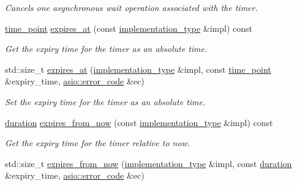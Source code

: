 \begin{DoxyCompactItemize}
\begin{DoxyCompactList}\small\item\em Cancels one asynchronous wait operation associated with the timer. \end{DoxyCompactList}\item 
\hyperlink{classasio_1_1waitable__timer__service_ae2aa2b85484d98323747703cb9e104df}{time\+\_\+point} \hyperlink{classasio_1_1waitable__timer__service_af369248a0a3dab5f46168a780176ba25}{expires\+\_\+at} (const \hyperlink{classasio_1_1waitable__timer__service_a397aa07a3c8f707a307b83a9616ed44e}{implementation\+\_\+type} \&impl) const 
\begin{DoxyCompactList}\small\item\em Get the expiry time for the timer as an absolute time. \end{DoxyCompactList}\item 
std\+::size\+\_\+t \hyperlink{classasio_1_1waitable__timer__service_a81514e94b12354e0fd2a0af363a352c7}{expires\+\_\+at} (\hyperlink{classasio_1_1waitable__timer__service_a397aa07a3c8f707a307b83a9616ed44e}{implementation\+\_\+type} \&impl, const \hyperlink{classasio_1_1waitable__timer__service_ae2aa2b85484d98323747703cb9e104df}{time\+\_\+point} \&expiry\+\_\+time, \hyperlink{classasio_1_1error__code}{asio\+::error\+\_\+code} \&ec)
\begin{DoxyCompactList}\small\item\em Set the expiry time for the timer as an absolute time. \end{DoxyCompactList}\item 
\hyperlink{classasio_1_1waitable__timer__service_a5ac45e701365614edd95291c94729ce4}{duration} \hyperlink{classasio_1_1waitable__timer__service_ae180692878e4dc1239c70e10f2181da7}{expires\+\_\+from\+\_\+now} (const \hyperlink{classasio_1_1waitable__timer__service_a397aa07a3c8f707a307b83a9616ed44e}{implementation\+\_\+type} \&impl) const 
\begin{DoxyCompactList}\small\item\em Get the expiry time for the timer relative to now. \end{DoxyCompactList}\item 
std\+::size\+\_\+t \hyperlink{classasio_1_1waitable__timer__service_a49dcf91e8be2e8b02835a239649824a7}{expires\+\_\+from\+\_\+now} (\hyperlink{classasio_1_1waitable__timer__service_a397aa07a3c8f707a307b83a9616ed44e}{implementation\+\_\+type} \&impl, const \hyperlink{classasio_1_1waitable__timer__service_a5ac45e701365614edd95291c94729ce4}{duration} \&expiry\+\_\+time, \hyperlink{classasio_1_1error__code}{asio\+::error\+\_\+code} \&ec)

\end{DoxyCompactItemize}

